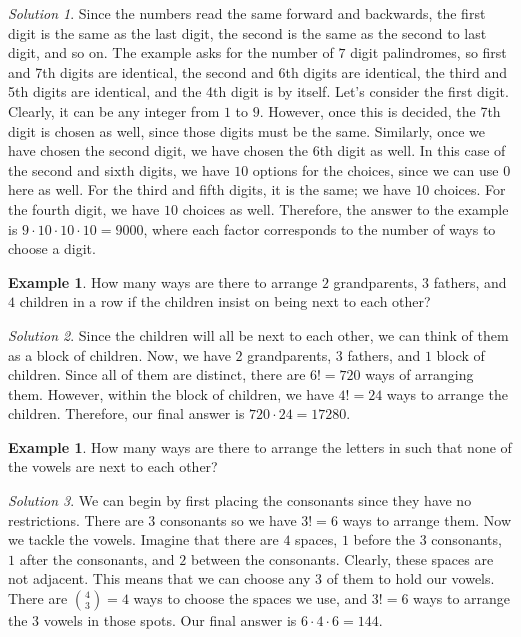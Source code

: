 \documentclass[l1pt]{article}
\theoremstyle{plain}
\theoremstyle{definition}
\newtheorem{example}[thm]{Example}
\theoremstyle{remark}
\newtheorem*{solution}{Solution}
\begin{document}
\begin{solution}
Since the numbers read the same forward and backwards, the first digit is the same as the last digit, the second is the same as the second to last digit, and so on. The example asks for the number of $7$ digit palindromes, so first and 7th digits are identical, the second and 6th digits are identical, the third and 5th digits are identical, and the 4th digit is by itself. Let's consider the first digit. Clearly, it can be any integer from $1$ to $9$. However, once this is decided, the 7th digit is chosen as well, since those digits must be the same. Similarly, once we have chosen the second digit, we have chosen the 6th digit as well. In this case of the second and sixth digits, we have $10$ options for the choices, since we can use $0$ here as well. For the third and fifth digits, it is the same; we have $10$ choices. For the fourth digit, we have $10$ choices as well. Therefore, the answer to the example is $9\cdot 10\cdot 10 \cdot 10=9000$, where each factor corresponds to the number of ways to choose a digit.
\end{solution}


\begin{example}
How many ways are there to arrange $2$ grandparents, $3$ fathers, and $4$ children in a row if the children insist on being next to each other?
\end{example}

\begin{solution}
Since the children will all be next to each other, we can think of them as a block of children. Now, we have $2$ grandparents, $3$ fathers, and $1$ block of children. Since all of them are distinct, there are $6!=720$ ways of arranging them. However, within the block of children, we have $4!=24$ ways to arrange the children. Therefore, our final answer is $720\cdot 24=17280.$
\end{solution}



\begin{example}
How many ways are there to arrange the letters in  such that none of the vowels are next to each other?
\end{example}

\begin{solution}
We can begin by first placing the consonants since they have no restrictions. There are $3$ consonants so we have $3!=6$ ways to arrange them. Now we tackle the vowels. Imagine that there are $4$ spaces, $1$ before the $3$ consonants, $1$ after the consonants, and $2$ between the consonants. Clearly, these spaces are not adjacent. This means that we can choose any $3$ of them to hold our vowels. There are $\binom{4}{3}=4$ ways to choose the spaces we use, and $3!=6$ ways to arrange the $3$ vowels in those spots. Our final answer is $6\cdot 4\cdot 6=144$.
\end{solution}
\end{document}
